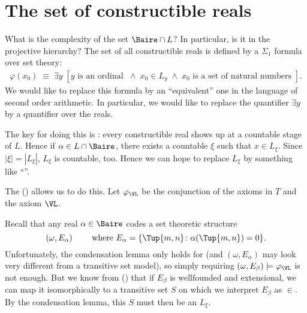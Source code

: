 \documentclass[letterpaper,10pt,english]{jupyterBook}
\begin{document}
\section{The set of constructible reals}
\label{\detokenize{constructible-reals:the-set-of-constructible-reals}}
\sphinxAtStartPar
What is the complexity of the set \(\Baire \cap L\)? In particular, is it in the projective hierarchy?
The set of all constructible reals is defined by a \(\Sigma_1\) formula over set theory:
\begin{equation*}
\begin{split}
   \varphi(x_0)	\; \equiv \; \exists y \; [y \text{ is an ordinal }  \; \wedge \; x_0 \in L_y \; \wedge \; x_0 \text{ is a set of natural numbers }  ].
\end{split}
\end{equation*}
\sphinxAtStartPar
We would like to replace this formula by an “equivalent” one in the language of second order arithmetic. In particular, we would like to replace the quantifier \(\exists y\) by a quantifier over the reals.

\sphinxAtStartPar
The key for doing this is {\hyperref[\detokenize{V=L:lemma-L-GCH}]{}}: every constructible real shows up at a countable stage of \(L\). Hence if \(\alpha \in L \cap \Baire\), there exists a countable \(\xi\) such that \(x \in L_\xi\). Since \(|\xi| = |L_\xi|\), \(L_\xi\) is countable, too. Hence we can hope to replace \(L_\xi\) by something like “”.

\sphinxAtStartPar
The  ({\hyperref[\detokenize{V=L:lem-condensation}]{}}) allows us to do this.
Let \(\varphi_{\VL}\) be the conjunction of the axioms in \(T\) and the axiom \(\VL\).

\sphinxAtStartPar
Recall that any real \(\alpha \in \Baire\) codes a set theoretic structure
\begin{equation*}
	(\omega, E_\alpha) \qquad \text{ where } E_\alpha = \{ \Tup{m,n} \colon \alpha(\Tup{m,n}) =  0 \}.
\end{equation*}
\sphinxAtStartPar
Unfortunately, the condensation lemma only holds for  (and \((\omega, E_\alpha)\) may look very different from a transitive set model), so simply requiring \((\omega,E_\beta) \models \varphi_{\VL}\) is not enough. But we know from {\hyperref[\detokenize{models:thm-Mostowski-collapse}]{}} () that if \(E_\beta\) is well\sphinxhyphen{}founded and extensional, we can map it isomorphically to a transitive set \(S\) on which we interpret \(E_\beta\) as \(\in\). By the condensation lemma, this \(S\) must then be an \(L_\xi\).
\end{document}
